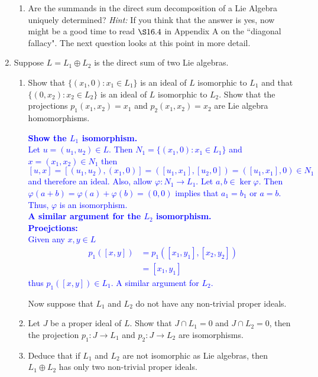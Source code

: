 \documentclass[12pt,a4paper]{report}
\newcommand{\BLUE}[1]{\textcolor{blue}{#1}}
\begin{document}
\begin{enumerate}[label=2.\arabic*]
\begin{enumerate}[label=(\roman*)]
	\item Are the summands in the direct sum decomposition of a Lie Algebra uniquely determined?  \textit{Hint: } If you think that the answer is yes, now might be a good time to read $\S 16.4$ in Appendix A on the ``diagonal fallacy".  The next question looks at this point in more detail.

\end{enumerate}

\item Suppose $L=L_1 \oplus L_2$ is the direct sum of two Lie algebras.
\begin{enumerate}[label=(\roman*)]

	\item Show that $\{(x_1,0):x_1 \in L_1\}$ is an ideal of $L$ isomorphic to $L_1$ and that $\{(0,x_2):x_2\in L_2\}$ is an ideal of $L$ isomorphic to $L_2$.  Show that the projections $p_1(x_1,x_2) = x_1$ and $p_2(x_1,x_2)=x_2$ are Lie algebra homomorphisms.
	
	\BLUE{\textbf{Show the $L_1$ isomorphism.}\\Let $u=(u_1, u_2) \in L$.  Then $N_1 = \{(x_1,0):x_1 \in L_1\}$ and $ x=(x_1, x_2)\in N_1$ then $[u,x] = [(u_1, u_2), (x_1, 0)] = ([u_1, x_1],[u_2,0]) =([u_1, x_1],0) \in N_1$ and therefore an ideal.  Also, allow $\varphi : N_1 \to L_1$.  Let $a,b \in \ker \varphi$.  Then $\varphi(a+b)= \varphi(a)+\varphi(b) = (0,0)$ implies that $a_1 =b_1$ or $a=b$.  Thus, $\varphi$ is an isomorphism. \\
	\textbf{A similar argument for the $L_2$ isomorphism.}\\
	\textbf{Proejctions:}\\
	Given any $x,y \in L$
	\begin{align*}
		p_1([x,y]) &= p_1([x_1,y_1],[x_2,y_2]) \\
		&= [x_1,y_1] 
	\end{align*}thus $p_1([x,y]) \in L_1$.  A similar argument for $L_2$.
	}
	
	Now suppose that $L_1$ and $L_2$ do not have any non-trivial proper ideals.
	
	\item Let $J$ be a proper ideal of $L$. Show that $J \cap L_1 =0$ and $J\cap L_2= 0$, then the projection $p_1:J \to L_1$ and $p_2: J\to L_2$ are isomorphisms.
	
	\item Deduce that if $L_1$ and $L_2$ are not isomorphic as Lie algebras, then $L_1\oplus L_2$ has only two non-trivial proper ideals.
	

\end{enumerate}
\end{enumerate}
\end{document}
